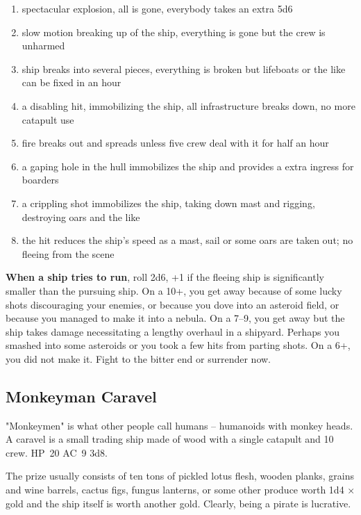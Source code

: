 \documentclass[a4paper,serif]{rpg-module}
\begin{document}
\begin{enumerate}
\item spectacular explosion, all is gone, everybody takes an extra 5d6
\item slow motion breaking up of the ship, everything is gone but the
  crew is unharmed
\item ship breaks into several pieces, everything is broken but
  lifeboats or the like can be fixed in an hour
\item a disabling hit, immobilizing the ship, all infrastructure
  breaks down, no more catapult use
\item fire breaks out and spreads unless five crew deal with it for
  half an hour
\item a gaping hole in the hull immobilizes the ship and provides a
  extra ingress for boarders
\item a crippling shot immobilizes the ship, taking down mast and
  rigging, destroying oars and the like
\item the hit reduces the ship's speed as a mast, sail or some oars
  are taken out; no fleeing from the scene
\end{enumerate}

\textbf{When a ship tries to run}, roll 2d6, +1 if the fleeing ship is
significantly smaller than the pursuing ship. On a 10+, you get away
because of some lucky shots discouraging your enemies, or because you
dove into an asteroid field, or because you managed to make it into a
nebula. On a 7--9, you get away but the ship takes damage
necessitating a lengthy overhaul in a shipyard. Perhaps you smashed
into some asteroids or you took a few hits from parting shots. On a
6+, you did not make it. Fight to the bitter end or surrender now.

\subsection{Monkeyman Caravel}
\label{sec:monkeyman-caravel}

"Monkeymen" is what other people call humans – humanoids with monkey
heads. A caravel is a small trading ship made of wood with a single
catapult and 10 crew. HP~20 AC~9 3d8.

The prize usually consists of ten tons of pickled lotus flesh, wooden
planks, grains and wine barrels, cactus figs, fungus lanterns, or some
other produce worth 1d4 × \unit[10,000]{gold} and the ship itself is
worth another \unit[10,000]{gold}. Clearly, being a pirate is
lucrative.
\end{document}
